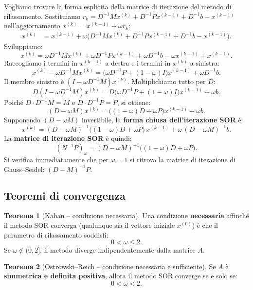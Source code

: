\documentclass[a4paper,12pt]{article}
\theoremstyle{definition}
\newtheorem{teorema}{Teorema}[section]
\theoremstyle{remark}
\begin{document}
Vogliamo trovare la forma esplicita della matrice di iterazione del metodo
di rilassamento.
Sostituiamo $r_k = D^{-1}Mx^{(k)} + D^{-1}Px^{(k-1)} + D^{-1}b - x^{(k-1)}$
nell'aggiornamento $x^{(k)} = x^{(k-1)} + \omega r_k$:
\begin{align*}
  x^{(k)}
  &= x^{(k-1)}
     + \omega\bigl(D^{-1}Mx^{(k)} + D^{-1}Px^{(k-1)} + D^{-1}b - x^{(k-1)}\bigr).
\end{align*}
Sviluppiamo:
\[
  x^{(k)}
  = \omega D^{-1}Mx^{(k)}
  + \omega D^{-1}Px^{(k-1)}
  + \omega D^{-1}b
  - \omega x^{(k-1)}
  + x^{(k-1)}.
\]
Raccogliamo i termini in $x^{(k-1)}$ a destra e i termini in $x^{(k)}$
a sinistra:
\[
  x^{(k)} - \omega D^{-1}Mx^{(k)}
  = \bigl(\omega D^{-1}P + (1-\omega)I\bigr)x^{(k-1)} + \omega D^{-1}b.
\]
Il membro sinistro è $(I - \omega D^{-1}M)x^{(k)}$.
Moltiplichiamo tutto per $D$:
\[
  D(I - \omega D^{-1}M)x^{(k)}
  = D\bigl(\omega D^{-1}P + (1-\omega)I\bigr)x^{(k-1)} + \omega b.
\]
Poiché $D \cdot D^{-1}M = M$ e $D \cdot D^{-1}P = P$, si ottiene:
\[
  (D - \omega M)x^{(k)}
  = \bigl((1-\omega)D + \omega P\bigr)x^{(k-1)} + \omega b.
\]
Supponendo $(D - \omega M)$ invertibile, la \textbf{forma chiusa dell'iterazione SOR} è:
\[
  \boxed{x^{(k)}
    = (D - \omega M)^{-1}\bigl((1-\omega)D + \omega P\bigr)\,x^{(k-1)}
    + \omega\,(D - \omega M)^{-1}b.}
\]
La \textbf{matrice di iterazione SOR} è quindi:
\[
  (N^{-1}P)_\omega
  = (D - \omega M)^{-1}\bigl((1-\omega)D + \omega P\bigr).
\]
Si verifica immediatamente che per $\omega = 1$ si ritrova la matrice di
iterazione di Gauss--Seidel: $(D-M)^{-1}P$.

\subsection{Teoremi di convergenza}

\begin{teorema}[Kahan -- condizione necessaria]
Una condizione \textbf{necessaria} affinché il metodo SOR converga
(qualunque sia il vettore iniziale $x^{(0)}$) è che il parametro di
rilassamento soddisfi:
\[
  0 < \omega \leq 2.
\]
Se $\omega \notin (0,2]$, il metodo diverge indipendentemente dalla
matrice $A$.
\end{teorema}

\begin{teorema}[Ostrowski--Reich -- condizione necessaria e sufficiente]
Se $A$ è \textbf{simmetrica e definita positiva}, allora il metodo SOR
converge se e solo se:
\[
  0 < \omega < 2.
\]
\end{teorema}
\end{document}
